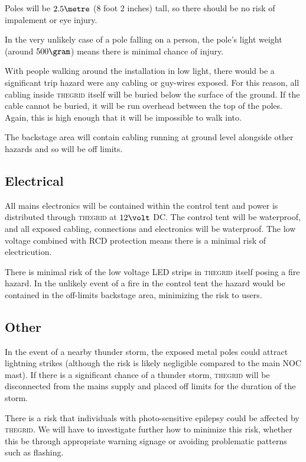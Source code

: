\documentclass[12pt]{article} %
\newcommand{\thegrid}{\textsc{the\textperiodcentered grid}\xspace}
\begin{document}
Poles will be $2.5\metre$ (8 foot 2 inches) tall, so there should be no risk of
impalement or eye injury.

In the very unlikely case of a pole falling on a person, the pole's light
weight (around $500\gram$) means there is minimal chance of injury.

With people walking around the installation in low light, there would be a
significant trip hazard were any cabling or guy-wires exposed.  For this
reason, all cabling inside \thegrid itself will be buried below the surface of
the ground.  If the cable cannot be buried, it will be run overhead between the
top of the poles.  Again, this is high enough that it will be impossible to
walk into.

The backstage area will contain cabling running at ground level alongside other
hazards and so will be off limits.

\subsection{Electrical}
All mains electronics will be contained within the control tent and power is
distributed through \thegrid at $12\volt$ DC\@.  The control tent will be
waterproof, and all exposed cabling, connections and electronics will be
waterproof.  The low voltage combined with RCD protection means there is a
minimal risk of electricution.

There is minimal risk of the low voltage LED strips in \thegrid itself posing a
fire hazard.  In the unlikely event of a fire in the control tent the hazard
would be contained in the off-limits backstage area, minimizing the risk to
users.

\subsection{Other}
In the event of a nearby thunder storm, the exposed metal poles could attract
lightning strikes (although the risk is  likely negligible compared to the main
NOC mast).  If there is a significant chance of a thunder storm, \thegrid will
be disconnected from the mains supply and placed off limits for the duration of
the storm.

There is a risk that individuals with photo-sensitive epilepsy could be
affected by \thegrid.  We will have to investigate further how to minimize this
risk, whether this be through appropriate warning signage or avoiding
problematic patterns such as flashing.
\end{document}

